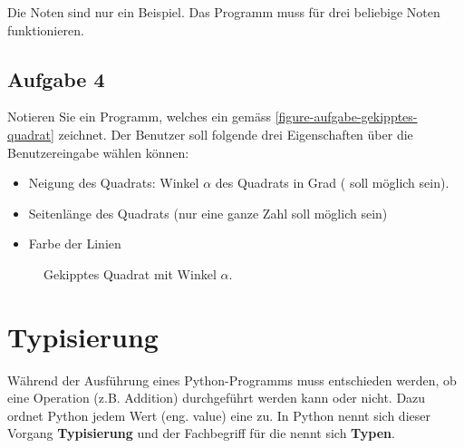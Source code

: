 Die Noten sind nur ein Beispiel. Das Programm muss für drei beliebige Noten funktionieren.

\fillwithgrid{2.5in}

\subsection{Aufgabe 4}

Notieren Sie ein Programm, welches ein  gemäss \autoref{figure-aufgabe-gekipptes-quadrat} zeichnet. Der Benutzer soll folgende drei Eigenschaften über die Benutzereingabe wählen können:

\begin{itemize}
\item Neigung des Quadrats: Winkel $\alpha$ des Quadrats in Grad ( soll möglich sein).
\item Seitenlänge des Quadrats (nur eine ganze Zahl soll möglich sein)
\item Farbe der Linien
\end{itemize}

\begin{figure}[htb]
\centering
\begin{minipage}{0.65\textwidth}
\centering
\fillwithgrid{3in}
\end{minipage}
\hfill
\begin{minipage}{0.3\textwidth}
\centering
{}
\caption{Gekipptes Quadrat mit Winkel $\alpha$.}
\label{figure-aufgabe-gekipptes-quadrat}
\end{minipage}
\end{figure}

\section{Typisierung}

Während der Ausführung eines Python-Programms muss entschieden werden, ob eine Operation (z.B. Addition) durchgeführt werden kann oder nicht. Dazu ordnet Python jedem Wert (eng. value) eine  zu. In Python nennt sich dieser Vorgang \textbf{Typisierung} und der Fachbegriff für die  nennt sich \textbf{Typen}.

